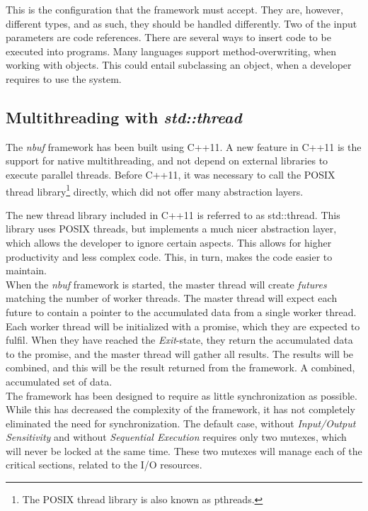 \documentclass[a4paper]{article}
\newcommand{\nbuf}{\textit{nbuf} }
\begin{document}
This is the configuration that the framework must accept. They are, however, different types, and as such, they should be handled differently. Two of the input parameters are code references. There are several ways to insert code to be executed into programs. Many languages support method-overwriting, when working with objects. This could entail subclassing an object, when a developer requires to use the system. 



\subsection{Multithreading with \textit{std::thread}}
The \nbuf framework has been built using C++11. A new feature in C++11 is the support for native multithreading, and not depend on external libraries to execute parallel threads. Before C++11, it was necessary to call the POSIX thread library\footnote{The POSIX thread library is also known as pthreads.} directly, which did not offer many abstraction layers. 

The new thread library included in C++11 is referred to as std::thread. This library uses POSIX threads, but implements a much nicer abstraction layer, which allows the developer to ignore certain aspects. This allows for higher productivity and less complex code. This, in turn, makes the code easier to maintain.\\

When the \nbuf framework is started, the master thread will create \textit{futures} matching the number of worker threads. The master thread will expect each future to contain a pointer to the accumulated data from a single worker thread. Each worker thread will be initialized with a promise, which they are expected to fulfil. When they have reached the \textit{Exit}-state, they return the accumulated data to the promise, and the master thread will gather all results. The results will be combined, and this will be the result returned from the framework. A combined, accumulated set of data.\\

The framework has been designed to require as little synchronization as possible. While this has decreased the complexity of the framework, it has not completely eliminated the need for synchronization. The default case, without \textit{Input/Output Sensitivity} and without \textit{Sequential Execution} requires only two mutexes, which will never be locked at the same time. These two mutexes will manage each of the critical sections, related to the I/O resources. \\
\end{document}
